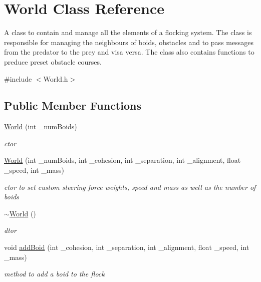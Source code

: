 \hypertarget{classWorld}{
\section{World Class Reference}
\label{classWorld}
}


A class to contain and manage all the elements of a flocking system. The class is responsible for managing the neighbours of boids, obstacles and to pass messages from the predator to the prey and visa versa. The class also contains functions to preduce preset obstacle courses.  


{\ttfamily \#include $<$World.h$>$}\subsection*{Public Member Functions}
\begin{DoxyCompactItemize}
\item 
\hyperlink{classWorld_a32b0ef05df703ff5fa85fe1a1f76d448}{World} (int \_\-numBoids)
\begin{DoxyCompactList}\small\item\em ctor \item\end{DoxyCompactList}\item 
\hyperlink{classWorld_a514d5dbba0e367784e1c36dd153f1e73}{World} (int \_\-numBoids, int \_\-cohesion, int \_\-separation, int \_\-alignment, float \_\-speed, int \_\-mass)
\begin{DoxyCompactList}\small\item\em ctor to set custom steering force weights, speed and mass as well as the number of boids \item\end{DoxyCompactList}\item 
\hyperlink{classWorld_a8c73fba541a5817fff65147ba47cd827}{$\sim$World} ()
\begin{DoxyCompactList}\small\item\em dtor \item\end{DoxyCompactList}\item 
void \hyperlink{classWorld_acb5c55c5acba136955f16bc43c8abc97}{addBoid} (int \_\-cohesion, int \_\-separation, int \_\-alignment, float \_\-speed, int \_\-mass)
\begin{DoxyCompactList}\small\item\em method to add a boid to the flock \item\end{DoxyCompactList}\item 

\end{DoxyCompactItemize}
